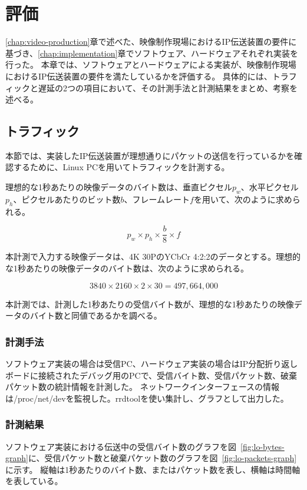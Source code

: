 \chapter{評価}
\label{chap:evaluation}

\ref{chap:video-production}章で述べた、映像制作現場におけるIP伝送装置の要件に基づき、\ref{chap:implementation}章でソフトウェア、ハードウェアそれぞれ実装を行った。
本章では、ソフトウェアとハードウェアによる実装が、映像制作現場におけるIP伝送装置の要件を満たしているかを評価する。
具体的には、トラフィックと遅延の2つの項目において、その計測手法と計測結果をまとめ、考察を述べる。

\section{トラフィック}

本節では、実装したIP伝送装置が理想通りにパケットの送信を行っているかを確認するために、Linux PCを用いてトラフィックを計測する。

理想的な1秒あたりの映像データのバイト数は、垂直ピクセル$p_w$、水平ピクセル$p_h$、ピクセルあたりのビット数$b$、フレームレート$f$を用いて、次のように求められる。

\[ p_w \times p_h \times \frac{b}{8} \times f \]

本計測で入力する映像データは、4K 30PのYCbCr 4:2:2のデータとする。理想的な1秒あたりの映像データのバイト数は、次のように求められる。

\[ 3840 \times 2160 \times 2 \times 30 = 497,664,000 \]

本計測では、計測した1秒あたりの受信バイト数が、理想的な1秒あたりの映像データのバイト数と同値であるかを調べる。

\subsection{計測手法}

ソフトウェア実装の場合は受信PC、ハードウェア実装の場合はIP分配折り返しボードに接続されたデバッグ用のPCで、受信バイト数、受信パケット数、破棄パケット数の統計情報を計測した。
ネットワークインターフェースの情報は/proc/net/devを監視した。rrdtoolを使い集計し、グラフとして出力した。

\subsection{計測結果}

ソフトウェア実装における伝送中の受信バイト数のグラフを図~\ref{fig:lo-bytes-graph}に、受信パケット数と破棄パケット数のグラフを図~\ref{fig:lo-packets-graph}に示す。
縦軸は1秒あたりのバイト数、またはパケット数を表し、横軸は時間軸を表している。

